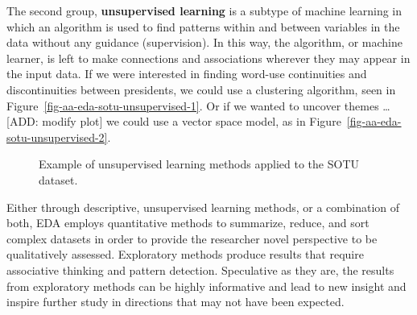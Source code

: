 \documentclass[
  letterpaper,
  DIV=11,
  numbers=noendperiod]{scrreport}
\theoremstyle{definition}
\theoremstyle{remark}
\begin{document}
The second group, \textbf{unsupervised learning} is a subtype of machine
learning in which an algorithm is used to find patterns within and
between variables in the data without any guidance (supervision). In
this way, the algorithm, or machine learner, is left to make connections
and associations wherever they may appear in the input data. If we were
interested in finding word-use continuities and discontinuities between
presidents, we could use a clustering algorithm, seen in
Figure~\ref{fig-aa-eda-sotu-unsupervised-1}. Or if we wanted to uncover
themes \ldots{}  {[}ADD: modify plot{]} we could use a
vector space model, as in Figure~\ref{fig-aa-eda-sotu-unsupervised-2}.

\begin{figure}

\begin{minipage}[t]{0.50\linewidth}

{\centering 


}

\end{minipage}%
%
\begin{minipage}[t]{0.50\linewidth}

{\centering 


}

\end{minipage}%

\caption{\label{fig-aa-eda-sotu-unsupervised}Example of unsupervised
learning methods applied to the SOTU dataset.}

\end{figure}

Either through descriptive, unsupervised learning methods, or a
combination of both, EDA employs quantitative methods to summarize,
reduce, and sort complex datasets in order to provide the researcher
novel perspective to be qualitatively assessed. Exploratory methods
produce results that require associative thinking and pattern detection.
Speculative as they are, the results from exploratory methods can be
highly informative and lead to new insight and inspire further study in
directions that may not have been expected.
\end{document}
